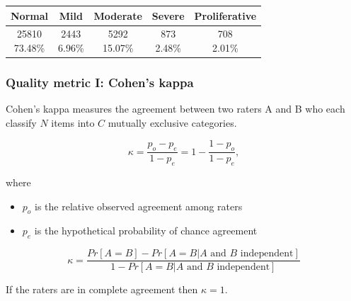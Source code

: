 \begin{frame}
\begin{tabular}{|@{}c@{}|@{}c@{}|@{}c@{}|@{}c@{}|@{}c@{}|}
Normal & Mild & Moderate & Severe & Proliferative \\

\hline
 \specialcell{25810\\ \footnotesize{73.48\%}}  & 
 \specialcell{2443\\\footnotesize6.96\%} & 
 \specialcell{5292\\\footnotesize15.07\%} & 
 \specialcell{873\\\footnotesize2.48\%} & 
 \specialcell{708\\\footnotesize2.01\%} \\

\hline
\end{tabular}

\end{frame}

\begin{frame}\frametitle{Quality metric I: Cohen's kappa}
Cohen's kappa measures the agreement between two raters A and B who each classify $N$ items into $C$ mutually exclusive categories. 

\[ \kappa = \frac{p_o - p_e}{1 - p_e} = 1- \frac{1 - p_o}{1 - p_e}, \]

where
\begin{itemize}
\item $p_o$ is the relative observed agreement among raters
\item $p_e$ is the hypothetical probability of chance agreement
\end{itemize}

\par \[\kappa=\frac{Pr[A=B]-Pr[A=B|A \text{ and }B \text{ independent}]}{1-Pr[A=B|A \text{ and }B \text{ independent}]} \]

\par If the raters are in complete agreement then $\kappa = 1$. 
\end{frame}


